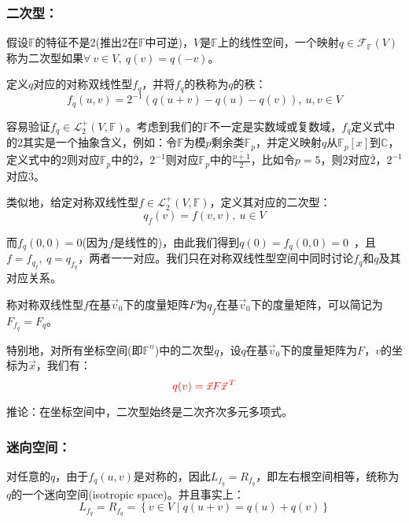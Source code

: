 \documentclass[zihao=-4,UTF8]{report}
\theoremstyle{mystyle} %
\begin{document}
\subsubsection{二次型：}
假设$\mathbb{F}$的特征不是2(推出2在$\mathbb{F}$中可逆)，$V$是$\mathbb{F}$上的线性空间，一个映射$q \in \mathcal{F}_{\mathbb{F}}(V)$称为二次型如果$\forall\ v \in V,\ q(v) = q(-v)$。\par
定义$q$对应的对称双线性型$f_q$，并将$f_q$的秩称为$q$的秩：
\begin{equation*}
    f_q(u,v) = 2^{-1}(q(u+v) - q(u)-q(v)),\ u,v \in V
\end{equation*}

{\color{gray}\small 容易验证$f_q \in \mathcal{L}_2^+(V,\mathbb{F})$。考虑到我们的$\mathbb{F}$不一定是实数域或复数域，$f_q$定义式中的$2$其实是一个抽象含义，例如：令$\mathbb{F}$为模$p$剩余类$\mathbb{F}_p$，并定义映射$q$从$\mathbb{F}_p[x]$到$\mathbb{C}$，定义式中的$2$则对应$\mathbb{F}_p$中的$\overline{2}$，$2^{-1}$则对应$\mathbb{F}_p$中的$\overline{\frac{p+1}{2}}$，比如令$p = 5$，则$2$对应$\overline{2}$，$2^{-1}$对应$\overline{3}$。}

类似地，给定对称双线性型$f \in \mathcal{L}_2^+(V,\mathbb{F})$，定义其对应的二次型：
\begin{equation*}
    q_f(v) = f(v,v),\ u \in V
\end{equation*}\par

{\color{gray}\small  而$f_q(0,0) = 0$(因为$f$是线性的)，由此我们得到$q(0) = f_q(0,0) = 0$\ ，且$f = f_{q_f},\ q = q_{f_q}$，两者一一对应。我们只在对称双线性型空间中同时讨论$f_q$和$q$及其对应关系。}\par
称对称双线性型$f$在基$\vec{v}_0$下的度量矩阵$F$为$q_f$在基$\vec{v}_0$下的度量矩阵，可以简记为$F_{f_q} = F_q$。\par
特别地，对所有坐标空间(即$\mathbb{F}^n$)中的二次型$q$，设$q$在基$\vec{v}_0$下的度量矩阵为$F$，$v$的坐标为$\vec{x}$，我们有：
\begin{equation*}\color{red}
    q(v) = \vec{x} F \vec{x}^{\,T}
\end{equation*}\par
推论：在坐标空间中，二次型始终是二次齐次多元多项式。
\subsubsection{迷向空间：}
对任意的$q$，由于$f_q(u,v)$是对称的，因此$L_{f_q} = R_{f_q}$，即左右根空间相等，统称为$q$的一个迷向空间(isotropic space)。并且事实上：
\begin{equation*}
    L_{f_q} = R_{f_q} = \left\{v\in V\mid q(u+v) = q(u) + q(v) \right\}
\end{equation*}
\end{document}
